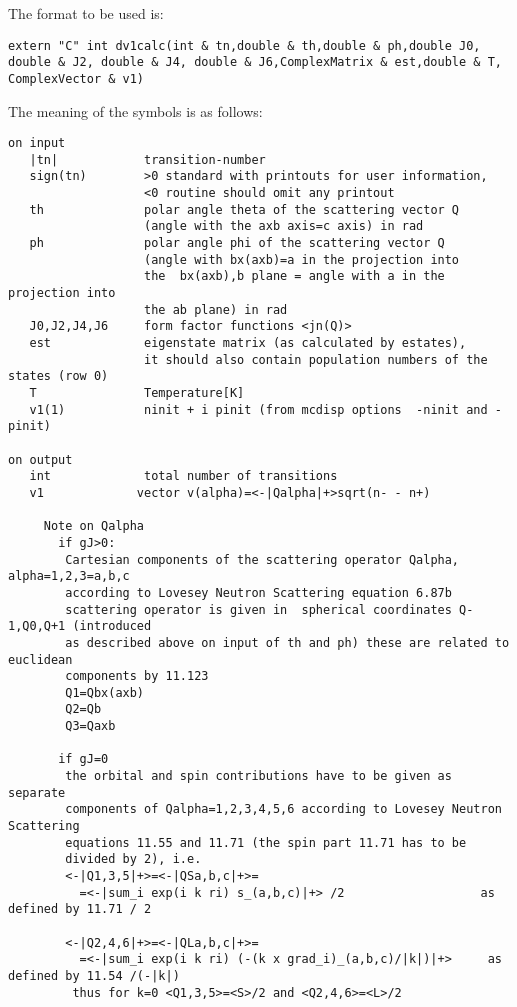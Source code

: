 The format to be used is:
{\footnotesize
\begin{verbatim}
extern "C" int dv1calc(int & tn,double & th,double & ph,double J0,
double & J2, double & J4, double & J6,ComplexMatrix & est,double & T,
ComplexVector & v1)
\end{verbatim}

The meaning of the symbols is as follows:

\begin{verbatim}
on input
   |tn|            transition-number  
   sign(tn)        >0 standard with printouts for user information, 
                   <0 routine should omit any printout
   th              polar angle theta of the scattering vector Q 
                   (angle with the axb axis=c axis) in rad
   ph              polar angle phi of the scattering vector Q 
                   (angle with bx(axb)=a in the projection into
                   the  bx(axb),b plane = angle with a in the projection into 
				   the ab plane) in rad
   J0,J2,J4,J6     form factor functions <jn(Q)>   
   est             eigenstate matrix (as calculated by estates),
                   it should also contain population numbers of the states (row 0)
   T               Temperature[K]
   v1(1)           ninit + i pinit (from mcdisp options  -ninit and -pinit)

on output
   int             total number of transitions
   v1             vector v(alpha)=<-|Qalpha|+>sqrt(n- - n+)
                   
     Note on Qalpha
       if gJ>0:
        Cartesian components of the scattering operator Qalpha, alpha=1,2,3=a,b,c
        according to Lovesey Neutron Scattering equation 6.87b 
        scattering operator is given in  spherical coordinates Q-1,Q0,Q+1 (introduced
        as described above on input of th and ph) these are related to euclidean 
		components by 11.123
        Q1=Qbx(axb)
        Q2=Qb                         
        Q3=Qaxb    
                   
       if gJ=0 
        the orbital and spin contributions have to be given as separate 
		components of Qalpha=1,2,3,4,5,6 according to Lovesey Neutron Scattering 
		equations 11.55 and 11.71 (the spin part 11.71 has to be
        divided by 2), i.e.
        <-|Q1,3,5|+>=<-|QSa,b,c|+>=
          =<-|sum_i exp(i k ri) s_(a,b,c)|+> /2                   as defined by 11.71 / 2
				   
        <-|Q2,4,6|+>=<-|QLa,b,c|+>=
          =<-|sum_i exp(i k ri) (-(k x grad_i)_(a,b,c)/|k|)|+>     as defined by 11.54 /(-|k|)
	     thus for k=0 <Q1,3,5>=<S>/2 and <Q2,4,6>=<L>/2 
				
\end{verbatim}
}


